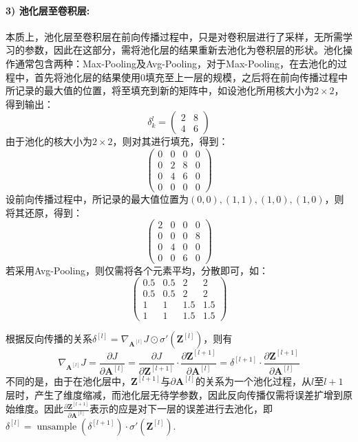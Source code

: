 \paragraph{3) 池化层至卷积层:}本质上，池化层至卷积层在前向传播过程中，只是对卷积层进行了采样，无所需学习的参数，因此在这部分，需将池化层的结果重新去池化为卷积层的形状。池化操作通常包含两种：Max-Pooling及Avg-Pooling，对于Max-Pooling，在去池化的过程中，首先将池化层的结果使用0填充至上一层的规模，之后将在前向传播过程中所记录的最大值的位置，将至填充到新的矩阵中，如设池化所用核大小为$2\times 2$，得到输出：
$$
\delta_{k}^{l}=\left(\begin{array}{ll}{2} & {8} \\ {4} & {6}\end{array}\right)
$$
由于池化的核大小为$2 \times 2$，则对其进行填充，得到：
$$
\left(\begin{array}{llll}{0} & {0} & {0} & {0} \\ {0} & {2} & {8} & {0} \\ {0} & {4} & {6} & {0} \\ {0} & {0} & {0} & {0}\end{array}\right)
$$
设前向传播过程中，所记录的最大值位置为$(0,0), (1, 1), (1, 0), (1, 0)$，则将其还原，得到：
$$
\left(\begin{array}{llll}{2} & {0} & {0} & {0} \\ {0} & {0} & {0} & {8} \\ {0} & {4} & {0} & {0} \\ {0} & {0} & {6} & {0}\end{array}\right)
$$
若采用Avg-Pooling，则仅需将各个元素平均，分散即可，如：
$$
  \left(\begin{array}{cccc}{0.5} & {0.5} & {2} & {2} \\ {0.5} & {0.5} & {2} & {2} \\ {1} & {1} & {1.5} & {1.5} \\ {1} & {1} & {1.5} & {1.5}\end{array}\right)
$$

根据反向传播的关系$\delta ^{[l]} = \nabla _{\mathbf{A}^{[l]}} J \odot \sigma' \left(\mathbf{Z}^{[l]}\right)$，则有
$$
\nabla _{\mathbf{A}^{[l]}} J = \frac{\partial J}{\partial \mathbf{A}^{[l]}} = \frac{\partial J}{\partial \mathbf{Z}^{[l + 1]}} \cdot \frac{\partial \mathbf{Z}^{[l + 1]}}{\partial \mathbf{A}^{[l]}} = \delta ^{[l + 1]} \cdot \frac{\partial \mathbf{Z}^{[l + 1]}}{\partial \mathbf{A}^{[l]}}
$$
不同的是，由于在池化层中，$\mathbf{Z}^{[l + 1]}$与${\partial \mathbf{A}^{[l]}}$的关系为一个池化过程，从$l$至$l+1$层时，产生了维度缩减，而池化层无待学参数，因此反向传播仅需将误差扩增到原始维度。因此$\frac{\partial \mathbf{Z}^{[l + 1]}}{\partial \mathbf{A}^{[l]}}$表示的应是对下一层的误差进行去池化，即$\delta ^{[l]} = \operatorname{unsample} \left(\delta ^{[l+1]}\right)\cdot \sigma' \left(\mathbf{Z}^{[l]}\right)$. 

